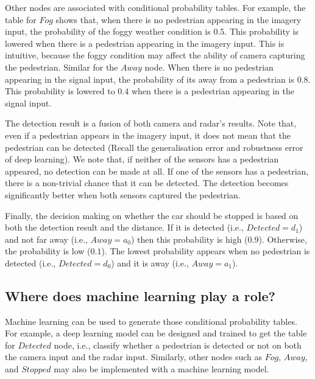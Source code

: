 Other nodes are associated with conditional probability tables. For example, the table for $Fog$ shows that, when there is no pedestrian appearing in the imagery input, the probability of the foggy weather condition is $0.5$.  This probability is lowered when there is a pedestrian appearing in the imagery input. This is intuitive, because the foggy condition may affect the ability of camera capturing the pedestrian. Similar for the $Away$ node. When there is no pedestrian appearing in the signal input, the probability of its away from a pedestrian is $0.8$. This probability is lowered to $0.4$ when there is a pedestrian appearing in the signal input. 

The detection result is a fusion of both camera and radar's results. Note that, even if a pedestrian appears in the imagery input, it does not mean that the pedestrian can be detected (Recall the generalisation error and robustness error of deep learning). We note that, if neither of the sensors has a pedestrian appeared, no detection can be made at all. If one of the sensors has a pedestrian, there is a non-trivial chance that it can be detected. The detection becomes significantly better when both sensors captured the pedestrian. 

Finally, the decision making on whether the car should be stopped is based on both the detection result and the distance. If it is detected (i.e., $Detected = d_1$) and not far away (i.e., $Away = a_0$) then this probability is high ($0.9$). Otherwise, the probability is low ($0.1$). The lowest probability appears when no pedestrian is detected (i.e., $Detected = d_0$) and it is away (i.e., $Away = a_1$). 

\subsection*{Where does machine learning play a role?}

Machine learning can be used to generate those conditional probability tables. For example, a deep learning model can be designed and trained to get the table for $Detected$ node, i.e., classify whether a pedestrian is detected or not on both the camera input and the radar input. Similarly, other nodes such as $Fog$, $Away$, and $Stopped$ may also be implemented with a machine learning model. 

